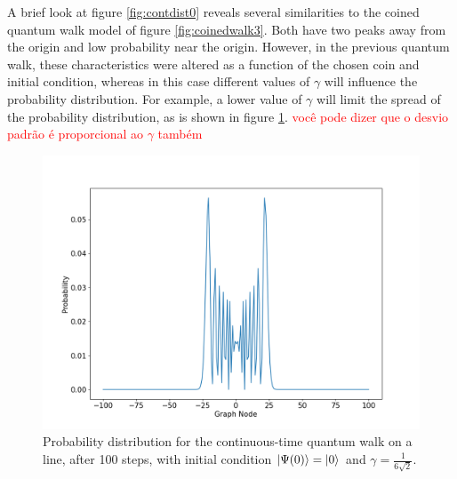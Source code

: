             A brief look at figure \ref{fig:contdist0} reveals several similarities to the coined quantum walk model of figure \ref{fig:coinedwalk3}. Both have two peaks away from the origin and low probability near the origin.
             However, in the previous quantum walk, these characteristics were altered as a function of the chosen coin and initial condition, whereas in this case different values of $\gamma$ will influence the probability distribution. For example, a lower value of $\gamma$ will limit the spread of the probability distribution, as is shown in figure \ref{fig:contdist1}. \textcolor{red}{você pode dizer que o desvio padrão é proporcional ao $\gamma$ também}
                \begin{figure}[!h]
                    \centering
                    \includegraphics[scale=0.40]{img/ContQW/ctqwSinglePsi0LowerGamma.png}
                    \caption{Probability distribution for the continuous-time quantum walk on a line, after 100 steps, with initial condition $\ket{\Psi(0)}=\ket{0}$ and $\gamma=\frac{1}{6\sqrt{2}}$.} 
                    \label{fig:contdist1}
                \end{figure}
                
